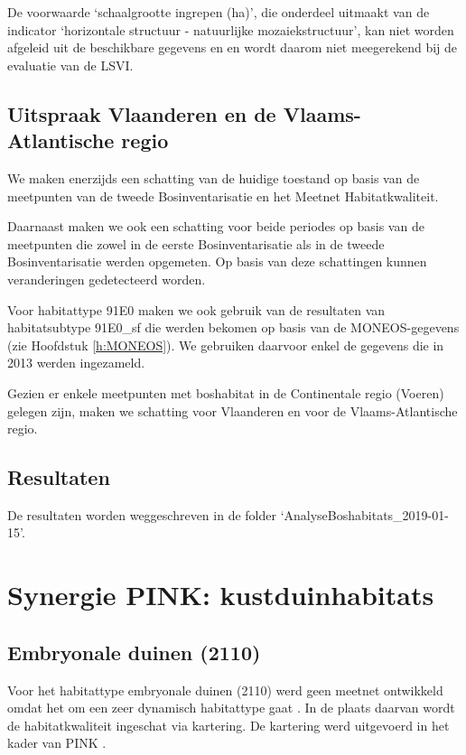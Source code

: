 \documentclass[twoside]{extreport}
\begin{document}
De voorwaarde `schaalgrootte ingrepen (ha)', die onderdeel uitmaakt van
de indicator `horizontale structuur - natuurlijke mozaiekstructuur', kan
niet worden afgeleid uit de beschikbare gegevens en en wordt daarom niet
meegerekend bij de evaluatie van de LSVI.

\section{Uitspraak Vlaanderen en de Vlaams-Atlantische
regio}\label{uitspraak-vlaanderen-en-de-vlaams-atlantische-regio-3}

We maken enerzijds een schatting van de huidige toestand op basis van de
meetpunten van de tweede Bosinventarisatie en het Meetnet
Habitatkwaliteit.

Daarnaast maken we ook een schatting voor beide periodes op basis van de
meetpunten die zowel in de eerste Bosinventarisatie als in de tweede
Bosinventarisatie werden opgemeten. Op basis van deze schattingen kunnen
veranderingen gedetecteerd worden.

Voor habitattype 91E0 maken we ook gebruik van de resultaten van
habitatsubtype 91E0\_sf die werden bekomen op basis van de
MONEOS-gegevens (zie Hoofdstuk \ref{h:MONEOS}). We gebruiken daarvoor
enkel de gegevens die in 2013 werden ingezameld.

Gezien er enkele meetpunten met boshabitat in de Continentale regio
(Voeren) gelegen zijn, maken we schatting voor Vlaanderen en voor de
Vlaams-Atlantische regio.

\section{Resultaten}\label{resultaten-3}

De resultaten worden weggeschreven in de folder
`AnalyseBoshabitats\_2019-01-15'.

\chapter{Synergie PINK:
kustduinhabitats}\label{synergie-pink-kustduinhabitats}

\section{Embryonale duinen (2110)}\label{embryonale-duinen-2110}

Voor het habitattype embryonale duinen (2110) werd geen meetnet
ontwikkeld omdat het om een zeer dynamisch habitattype gaat
\citep{Westra2014}. In de plaats daarvan wordt de habitatkwaliteit
ingeschat via kartering. De kartering werd uitgevoerd in het kader van
PINK \citep{Provoost2015}.
\end{document}
